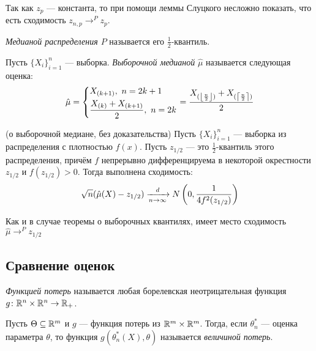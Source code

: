 \begin{note}
	Так как $z_p$ --- константа, то при помощи леммы Слуцкого несложно показать, что есть сходимость $z_{n, p} \to^P z_p$.
\end{note}

\begin{definition}
	\textit{Медианой распределения $P$} называется его $\frac{1}{2}$-квантиль.
\end{definition}

\begin{definition}
	Пусть $\{X_i\}_{i = 1}^n$ --- выборка. \textit{Выборочной медианой} $\hat{\mu}$ называется следующая оценка:
	\[
		\hat{\mu} = \left\{\begin{aligned}
			&{X_{(k + 1)},\ n = 2k + 1}
			\\
			&{\frac{X_{(k)} + X_{(k + 1)}}{2},\ n = 2k}
		\end{aligned}\right. = \frac{X_{(\left\lfloor\frac{n}{2}\right\rfloor)} + X_{(\left\lceil\frac{n}{2}\right\rceil)}}{2}
	\]
\end{definition}

\begin{theorem} (о выборочной медиане, без доказательства)
	Пусть $\{X_i\}_{i = 1}^n$ --- выборка из распределения с плотностью $f(x)$. Пусть $z_{1 / 2}$ --- это $\frac{1}{2}$-квантиль этого распределения, причём $f$ непрерывно дифференцируема в некоторой окрестности $z_{1 / 2}$ и $f(z_{1 / 2}) > 0$. Тогда выполнена сходимость:
	\[
		\sqrt{n}(\hat{\mu}(X) - z_{1 / 2}) \xrightarrow[n \to \infty]{d} N\left(0, \frac{1}{4f^2(z_{1 / 2})}\right)
	\]
\end{theorem}

\begin{note}
	Как и в случае теоремы о выборочных квантилях, имеет место сходимость $\hat{\mu} \to^P z_{1 / 2}$
\end{note}

\subsection{Сравнение оценок}

\begin{definition}
	\textit{Функцией потерь} называется любая борелевская неотрицательная функция $g \colon \mathbb{R}^n \times \mathbb{R}^n \to \mathbb{R}_+$.
\end{definition}

\begin{definition}
	Пусть $\Theta \subseteq \mathbb{R}^m$ и $g$ --- функция потерь из $\mathbb{R}^m \times \mathbb{R}^m$. Тогда, если $\theta_n^*$ --- оценка параметра $\theta$, то функция $g(\theta_n^*(X), \theta)$ называется \textit{величиной потерь}.
\end{definition}

